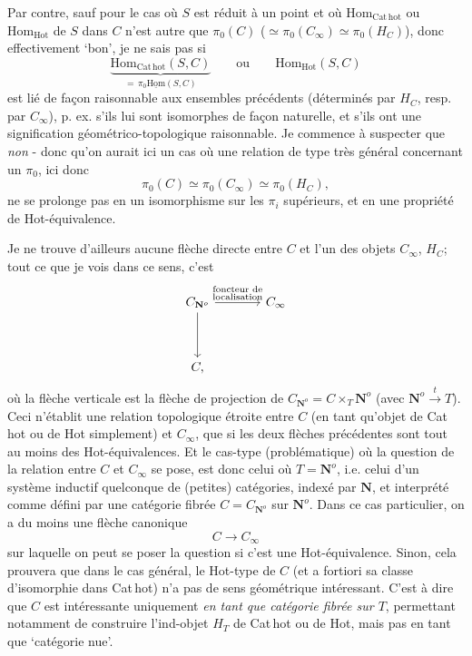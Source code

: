 \documentclass[11pt]{article}
\newcommand{\printedpage}[1]{\marginpar{\footnotesize p.~#1}}
\newcommand{\msp}[1]{\marginpar{\vspace*{10pt}\footnotesize [#1]}}
\newcommand{\Hom}{\mathrm{Hom}}
\newcommand{\uHom}{\underline{\mathrm{Hom}}}
\newcommand{\Cathot}{\mathrm{Cat\,hot}}
\newcommand{\Hot}{\mathrm{Hot}}
\newcommand{\CNo}{C_{\mathbf{N}^{o}}}
\begin{document}
Par contre, sauf pour le cas où $S$ est réduit à un point et où $\Hom_{\Cathot}$ ou $\Hom_{\Hot}$ de $S$ dans $C$ n'est autre que $\pi_{0}(C)$ ($\simeq \pi_{0}(C_{\infty}) \simeq \pi_{0}(H_{C})$), donc effectivement ‘bon', je ne sais pas si
\[
\underbrace{\Hom_{\Cathot}(S,C)}_{=\,\pi_{0}\uHom(S,C)} \qquad \text{ou} \qquad \Hom_{\Hot}(S,C)
\]
est lié de façon raisonnable aux ensembles précédents (déterminés par $H_{C}$, resp. par $C_{\infty}$), p. ex. s'ils lui sont isomorphes de façon naturelle, et s'ils ont une signification géométrico-topologique raisonnable. Je commence à suspecter que \textit{non} - donc qu'on aurait ici un cas où une relation de type très général concernant un $\pi_{0}$, ici donc
\[
\pi_{0}(C) \simeq \pi_{0}(C_{\infty}) \simeq \pi_{0}(H_{C}),
\]
ne se prolonge pas en un isomorphisme sur les $\pi_{i}$ supérieurs, et en une propriété de Hot-équivalence.

\printedpage{69}

\msp{page 108}
Je ne trouve d'ailleurs aucune flèche directe entre $C$ et l'un des objets $C_{\infty}$, $H_{C}$; tout ce que je vois dans ce sens, c'est
\[
\begin{tikzcd}[column sep=large, row sep=huge]
\CNo \arrow[r, "{\substack{\text{foncteur de}\\ \text{localisation}}}"] \arrow[d] & C_{\infty} \\
C, &
\end{tikzcd}
\]
où la flèche verticale est la flèche de projection de $\CNo = C \times_{T} \mathbf{N}^{o}$ (avec $\mathbf{N}^{o} \xrightarrow{\ t\ } T$). Ceci n'établit une relation topologique étroite entre $C$ (en tant qu'objet de Cat\,hot ou de Hot simplement) et $C_{\infty}$, que si les deux flèches précédentes sont tout au moins des Hot-équivalences. Et le cas-type (problématique) où la question de la relation entre $C$ et $C_{\infty}$ se pose, est donc celui où $T = \mathbf{N}^{o}$, i.e. celui d'un système inductif quelconque de (petites) catégories, indexé par $\mathbf{N}$, et interprété comme défini par une catégorie fibrée $C = \CNo$ sur $\mathbf{N}^{o}$. Dans ce cas particulier, on a du moins une flèche canonique
\[
C \longrightarrow C_{\infty}
\]
sur laquelle on peut se poser la question si c'est
\msp{page 109}
une Hot-équivalence. Sinon, cela prouvera que dans le cas général, le Hot-type de $C$ (et a fortiori sa classe d'isomorphie dans Cat\,hot) n'a pas de sens géométrique intéressant. C'est à dire que $C$ est intéressante uniquement \textit{en tant que catégorie fibrée sur $T$}, permettant notamment de construire l'ind-objet $H_{T}$ de Cat\,hot ou de Hot, mais pas en tant que `catégorie nue'.
\end{document}
